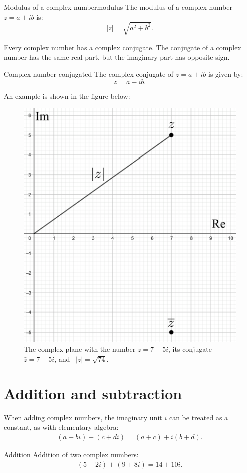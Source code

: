 \begin{definition}{Modulus of a complex number}{modulus}
The modulus of a complex number $z=a+ib$ is:
$$\mid z\mid=\sqrt{a^2+b^2}.$$
\end{definition}
\noindent
Every complex number has a complex conjugate. The conjugate of a complex number has the same real part, but the imaginary part has opposite sign.
\\

\begin{definition}{Complex number conjugated}{}
The complex conjugate of $z=a+ib$ is given by:
$$\bar{z}=a-ib.$$
\end{definition}

\noindent An example is shown in the figure below:

\begin{figure}[H]
\centering
\includegraphics[scale=0.2]{fig/img/complex_plan}
\caption{The complex plane with the number $z=7+5i$, its conjugate $\bar{z}=7-5i$, and \  $|z|=\sqrt{74}$.}
\end{figure}


\section{Addition and subtraction}
When adding complex numbers, the imaginary unit $i$ can be treated as a constant, as with elementary algebra:
\begin{align*}
(a + bi) + (c + di) = (a + c) + i(b + d).
\end{align*} 
\begin{example}{Addition}{}
Addition of two complex numbers:
\begin{align*}
(5+2i)+(9+8i)=14+10i.
\end{align*}
\end{example}


